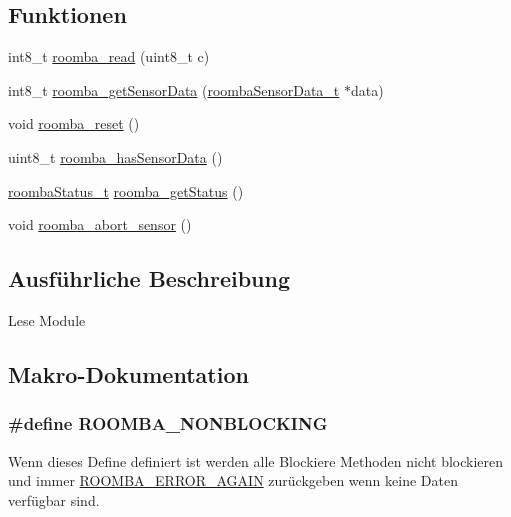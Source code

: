 \subsection*{Funktionen}
\begin{DoxyCompactItemize}
\item 
int8\-\_\-t \hyperlink{group__reader_ga0174eded302cf02ac49a990e385cfe90}{roomba\-\_\-read} (uint8\-\_\-t c)
\item 
int8\-\_\-t \hyperlink{group__reader_ga3082696b4e010cc447298466b4f6d90b}{roomba\-\_\-get\-Sensor\-Data} (\hyperlink{group__roomba__def_gab15b5566c76fa573575afaccd593e86a}{roomba\-Sensor\-Data\-\_\-t} $\ast$data)
\item 
void \hyperlink{group__reader_ga37eb8be9c6766f717f12e83837cd1cd9}{roomba\-\_\-reset} ()
\item 
uint8\-\_\-t \hyperlink{group__reader_ga5e82acf96df5ac30063b6abbcbeeeea9}{roomba\-\_\-has\-Sensor\-Data} ()
\item 
\hyperlink{group__reader_gaee08b378f859db5b29b55d1c980a8df9}{roomba\-Status\-\_\-t} \hyperlink{group__reader_ga59df7bd192d391fdac537ea1ddaf19f5}{roomba\-\_\-get\-Status} ()
\item 
void \hyperlink{group__reader_ga4f970b48b2983cf826a29d2cafc05dc3}{roomba\-\_\-abort\-\_\-sensor} ()
\end{DoxyCompactItemize}


\subsection{Ausführliche Beschreibung}
Lese Module 

\subsection{Makro-\/\-Dokumentation}
\hypertarget{group__reader_gad57079c91b29054a870a52e296de7c8f}{
\subsubsection[{R\-O\-O\-M\-B\-A\-\_\-\-N\-O\-N\-B\-L\-O\-C\-K\-I\-N\-G}]{\setlength{\rightskip}{0pt plus 5cm}\#define R\-O\-O\-M\-B\-A\-\_\-\-N\-O\-N\-B\-L\-O\-C\-K\-I\-N\-G}}\label{group__reader_gad57079c91b29054a870a52e296de7c8f}
Wenn dieses Define definiert ist werden alle Blockiere Methoden nicht blockieren und immer \hyperlink{group__roomba__error_gad35f7cffbb363514d9453cea041593e4}{R\-O\-O\-M\-B\-A\-\_\-\-E\-R\-R\-O\-R\-\_\-\-A\-G\-A\-I\-N} zurückgeben wenn keine Daten verfügbar sind.

